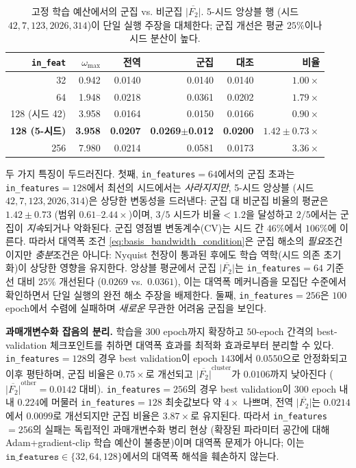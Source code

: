 \documentclass[11pt, a4paper]{article}
\theoremstyle{definition}
\theoremstyle{plain}
\begin{document}
\begin{table}[ht]
\centering
\caption{고정 학습 예산에서의 군집 vs. 비군집 $\overline{|F_2|}$. 5-시드 앙상블 행 (시드 $42,7,123,2026,314$)이 단일 실행 주장을 대체한다; 군집 개선은 평균 $25\%$이나 시드 분산이 높다.}
\label{tab:basis_scaling}
\small
\begin{tabular}{rrrrrr}
\toprule
\texttt{in\_feat} & $\omega_{\max}$ & 전역 &
  군집 & 대조 & 비율 \\
\midrule
32   & 0.942 & 0.0140 & 0.0140 & 0.0140 & $1.00\times$ \\
64   & 1.948 & 0.0218 & 0.0361 & 0.0202 & $1.79\times$ \\
128 (시드 42)  & 3.958 & 0.0164 &
  0.0150 & 0.0166 & $0.90\times$ \\
\textbf{128 (5-시드)} & \textbf{3.958} & \textbf{0.0207} &
  \textbf{0.0269}$\pm$\textbf{0.012} & \textbf{0.0200} & $\mathbf{1.42\pm0.73\times}$ \\
256  & 7.980 & 0.0214 & 0.0581 & 0.0173 & $3.36\times$ \\
\bottomrule
\end{tabular}
\end{table}

\noindent 두 가지 특징이 두드러진다. 첫째, \texttt{in\_features}$=64$에서의 군집 초과는 \texttt{in\_features}$=128$에서 최선의 시드에서는 \emph{사라지지만}, 5-시드 앙상블 (시드 $42, 7, 123, 2026, 314$)은 상당한 변동성을 드러낸다: 군집 대 비군집 비율의 평균은 $1.42\pm0.73$ (범위 $0.61$--$2.44\times$)이며, $3/5$ 시드가 비율${}<1.2$을 달성하고 $2/5$에서는 군집이 \emph{지속}되거나 악화된다. 군집 영점별 변동계수(CV)는 시드 간 $46\%$에서 $106\%$에 이른다. 따라서 대역폭 조건 \eqref{eq:basis_bandwidth_condition}은 군집 해소의 \emph{필요}조건이지만 \emph{충분}조건은 아니다: Nyquist 천장이 통과된 후에도 학습 역학(시드 의존 초기화)이 상당한 영향을 유지한다. 앙상블 평균에서 군집 $\overline{|F_2|}$는 \texttt{in\_features}$=64$ 기준선 대비 $25\%$ 개선된다 ($0.0269$ vs.\ $0.0361$), 이는 대역폭 메커니즘을 모집단 수준에서 확인하면서 단일 실행의 완전 해소 주장을 배제한다. 둘째, \texttt{in\_features}$=256$은 $100$ epoch에서 수렴에 실패하며 \emph{새로운} 무관한 어려움 군집을 보인다.

\smallskip
\noindent\textbf{과매개변수화 잡음의 분리.} 학습을 $300$ epoch까지 확장하고 $50$-epoch 간격의 best-validation 체크포인트를 취하면 대역폭 효과를 최적화 효과로부터 분리할 수 있다. \texttt{in\_features}$=128$의 경우 best validation이 epoch $143$에서 $0.0550$으로 안정화되고 이후 평탄하며, 군집 비율은 $0.75\times$로 개선되고 $\overline{|F_2|}^{\mathrm{cluster}}$가 $0.0106$까지 낮아진다 ($\overline{|F_2|}^{\mathrm{other}}=0.0142$ 대비). \texttt{in\_features}$=256$의 경우 best validation이 $300$ epoch 내내 $0.224$에 머물러 \texttt{in\_features}$=128$ 최솟값보다 약 $4\times$ 나쁘며, 전역 $\overline{|F_2|}$는 $0.0214$에서 $0.0099$로 개선되지만 군집 비율은 $3.87\times$로 유지된다. 따라서 \texttt{in\_features}$=256$의 실패는 독립적인 과매개변수화 병리 현상 (확장된 파라미터 공간에 대해 Adam+gradient-clip 학습 예산이 불충분)이며 대역폭 문제가 아니다; 이는 $\texttt{in\_features}\in\{32,64,128\}$에서의 대역폭 해석을 훼손하지 않는다.
\end{document}
